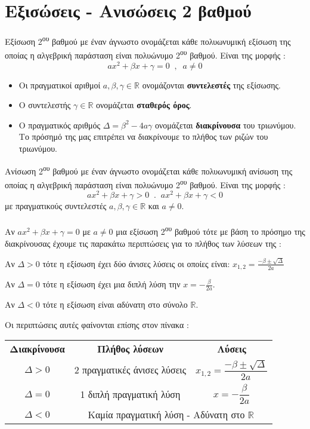 \section{Εξισώσεις - Ανισώσεις 2 βαθμού}
\orismoi
{}
Εξίσωση 2\textsuperscript{ου} βαθμού με έναν άγνωστο ονομάζεται κάθε πολυωνυμική εξίσωση της οποίας η αλγεβρική παράσταση είναι πολυώνυμο 2\textsuperscript{ου} βαθμού. Είναι της μορφής :
\[ ax^2+\beta x+\gamma=0\;\;,\;\;a\neq0 \]
\begin{itemize}[itemsep=0mm]
\item Οι πραγματικοί αριθμοί $ a,\beta,\gamma\in\mathbb{R} $ ονομάζονται \textbf{συντελεστές} της εξίσωσης.
\item Ο συντελεστής $ \gamma\in\mathbb{R} $ ονομάζεται \textbf{σταθερός όρος}.
\item O πραγματικός αριθμός $ \varDelta=\beta^2-4a\gamma $ ονομάζεται \textbf{διακρίνουσα} του τριωνύμου. Το πρόσημό της μας επιτρέπει να διακρίνουμε το πλήθος των ριζών του τριωνύμου.
\end{itemize}
Ανίσωση 2\textsuperscript{ου} βαθμού με έναν άγνωστο ονομάζεται κάθε πολυωνυμική ανίσωση της οποίας η αλγεβρική παράσταση είναι πολυώνυμο 2\textsuperscript{ου} βαθμού. Είναι της μορφής :
\[ ax^2+\beta x+\gamma>0\;\;.\;\;ax^2+\beta x+\gamma<0 \]
με πραγματικούς συντελεστές $ a,\beta,\gamma\in\mathbb{R} $ και $ a\neq0 $.\\\\
\thewrhmata
{}
Αν $ ax^2+\beta x+\gamma=0 $ με $ a\neq0 $ μια εξίσωση 2\textsuperscript{ου} βαθμού τότε με βάση το πρόσημο της διακρίνουσας έχουμε τις παρακάτω περιπτώσεις για το πλήθος των λύσεων της :
\begin{rlist}
\item Αν $ \varDelta>0 $ τότε η εξίσωση έχει δύο άνισες λύσεις οι οποίες είναι: $ x_{1,2}=\frac{-\beta\pm\!\sqrt{\varDelta}}{2a} $
\item Αν $ \varDelta=0 $ τότε η εξίσωση έχει μια διπλή λύση την $ x=-\frac{\beta}{2a} $.
\item Αν $ \varDelta<0 $ τότε η εξίσωση είναι αδύνατη στο σύνολο $ \mathbb{R} $.
\end{rlist}
Οι περιπτώσεις αυτές φαίνονται επίσης στον πίνακα :
\begin{center}
\begin{tabular}{ccc}
\hline\textbf{Διακρίνουσα} & \textbf{Πλήθος λύσεων} & \textbf{Λύσεις} \rule[-2ex]{0pt}{5.5ex}\\ 
\hhline{===}\rule[-2ex]{0pt}{7ex} $ \varDelta>0 $ &  2 πραγματικές άνισες λύσεις & $ x_{1,2}=\dfrac{-\beta\pm\!\sqrt{\varDelta}}{2a} $  \\
\rule[-2ex]{0pt}{5.5ex} $ \varDelta=0 $ & 1 διπλή πραγματική λύση & $ x=-\dfrac{\beta}{2a} $\\
\rule[-2ex]{0pt}{5.5ex} $ \varDelta<0 $ & \multicolumn{2}{c}{Καμία πραγματική λύση - Αδύνατη στο $ \mathbb{R} $}\\
\hline 
\end{tabular}
\end{center}
